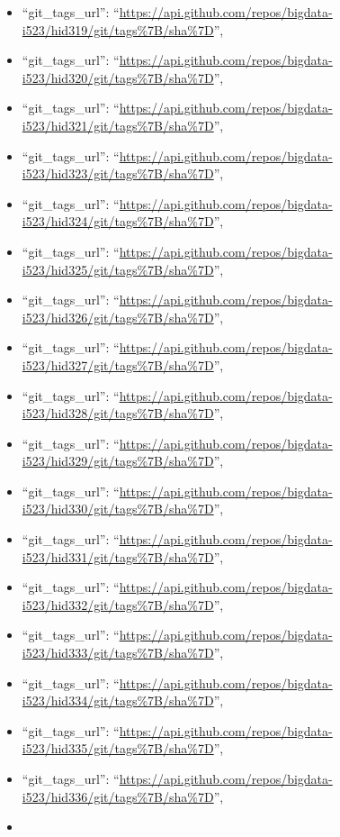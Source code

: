 \begin{itemize}
\item
  ``git\_tags\_url'':
  ``\url{https://api.github.com/repos/bigdata-i523/hid319/git/tags\%7B/sha\%7D}'',
\item
  ``git\_tags\_url'':
  ``\url{https://api.github.com/repos/bigdata-i523/hid320/git/tags\%7B/sha\%7D}'',
\item
  ``git\_tags\_url'':
  ``\url{https://api.github.com/repos/bigdata-i523/hid321/git/tags\%7B/sha\%7D}'',
\item
  ``git\_tags\_url'':
  ``\url{https://api.github.com/repos/bigdata-i523/hid323/git/tags\%7B/sha\%7D}'',
\item
  ``git\_tags\_url'':
  ``\url{https://api.github.com/repos/bigdata-i523/hid324/git/tags\%7B/sha\%7D}'',
\item
  ``git\_tags\_url'':
  ``\url{https://api.github.com/repos/bigdata-i523/hid325/git/tags\%7B/sha\%7D}'',
\item
  ``git\_tags\_url'':
  ``\url{https://api.github.com/repos/bigdata-i523/hid326/git/tags\%7B/sha\%7D}'',
\item
  ``git\_tags\_url'':
  ``\url{https://api.github.com/repos/bigdata-i523/hid327/git/tags\%7B/sha\%7D}'',
\item
  ``git\_tags\_url'':
  ``\url{https://api.github.com/repos/bigdata-i523/hid328/git/tags\%7B/sha\%7D}'',
\item
  ``git\_tags\_url'':
  ``\url{https://api.github.com/repos/bigdata-i523/hid329/git/tags\%7B/sha\%7D}'',
\item
  ``git\_tags\_url'':
  ``\url{https://api.github.com/repos/bigdata-i523/hid330/git/tags\%7B/sha\%7D}'',
\item
  ``git\_tags\_url'':
  ``\url{https://api.github.com/repos/bigdata-i523/hid331/git/tags\%7B/sha\%7D}'',
\item
  ``git\_tags\_url'':
  ``\url{https://api.github.com/repos/bigdata-i523/hid332/git/tags\%7B/sha\%7D}'',
\item
  ``git\_tags\_url'':
  ``\url{https://api.github.com/repos/bigdata-i523/hid333/git/tags\%7B/sha\%7D}'',
\item
  ``git\_tags\_url'':
  ``\url{https://api.github.com/repos/bigdata-i523/hid334/git/tags\%7B/sha\%7D}'',
\item
  ``git\_tags\_url'':
  ``\url{https://api.github.com/repos/bigdata-i523/hid335/git/tags\%7B/sha\%7D}'',
\item
  ``git\_tags\_url'':
  ``\url{https://api.github.com/repos/bigdata-i523/hid336/git/tags\%7B/sha\%7D}'',
\item

\end{itemize}
